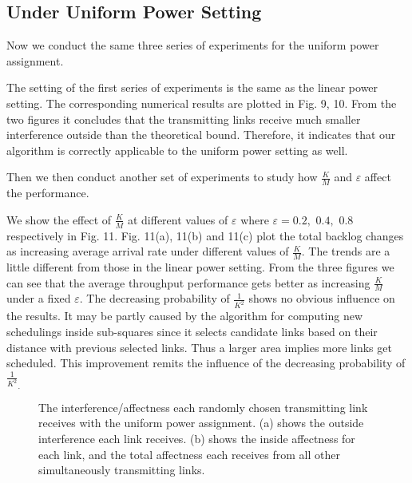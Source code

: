 \documentclass[journal]{IEEEtran}
\begin{document}
\subsection{Under Uniform Power Setting}
Now we conduct the same three series of experiments for the uniform power assignment.


The setting of the first series of experiments is the same as the linear power setting. The corresponding numerical results are plotted in Fig. 9, 10. From the two figures it concludes that the transmitting links receive much smaller interference outside than the theoretical bound. Therefore, it indicates that our algorithm is correctly applicable to the uniform power setting as well.

Then we then conduct another set of experiments to study how $\frac{K}{M}$  and $\varepsilon$ affect the performance.

We show the effect of $\frac{K}{M}$ at different values of $\varepsilon$ where $\varepsilon=0.2,$  $ 0.4,$  $ 0.8$ respectively in Fig. 11. Fig. 11(a), 11(b) and 11(c) plot the total backlog changes as increasing average arrival rate under different values of $\frac{K}{M}$. The trends are a little different from those in the linear power setting. From the three figures we can see that the average throughput performance gets better as increasing $\frac{K}{M}$ under a fixed $\varepsilon$. The decreasing probability of $\frac{1}{K^2}$ shows no obvious influence on the results. It may be partly caused by the algorithm for computing new schedulings inside sub-squares since it selects candidate links based on their distance with previous selected links. Thus a larger area implies more links get scheduled. This improvement remits the influence of the decreasing probability of  $\frac{1}{K^2}_.$

\begin{figure}[htpb]
 \centering
\centering
  \hspace{0cm}
 \hfill
     \caption{{\small{The interference/affectness each randomly chosen transmitting link receives with the uniform power assignment. (a) shows the outside interference each link receives. (b) shows the inside affectness for each link, and the total affectness each receives from all other simultaneously transmitting links.}}}
\end{figure}
\end{document}
